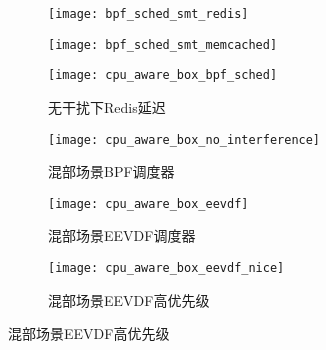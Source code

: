 \begin{figure}[H]
    \centering
    \begin{subfigure}[b]{0.49\textwidth}
        \texttt{[image: bpf\_sched\_smt\_redis]}
        \label{fig:bpf_sched_smt_redis}
    \end{subfigure}
    \begin{subfigure}[b]{0.49\textwidth}
        \texttt{[image: bpf\_sched\_smt\_memcached]}
        \label{fig:bpf_sched_smt_memcached}
    \end{subfigure}
\label{fig:lc_bpf_sched}
\end{figure}

\begin{figure}[H]
    \centering
    \begin{subfigure}[b]{0.4\textwidth}
        \texttt{[image: cpu\_aware\_box\_bpf\_sched]}
        \caption{无干扰下Redis延迟}
        \label{fig:cpu_aware_box_bpf_sched}
    \end{subfigure}
    \begin{subfigure}[b]{0.4\textwidth}
        \texttt{[image: cpu\_aware\_box\_no\_interference]}
        \caption{混部场景BPF调度器}
        \label{fig:cpu_aware_box_no_interference}
    \end{subfigure}
    \begin{subfigure}[b]{0.4\textwidth}
        \texttt{[image: cpu\_aware\_box\_eevdf]}
        \caption{混部场景EEVDF调度器}
        \label{fig:cpu_aware_box_eevdf}
    \end{subfigure}
    \begin{subfigure}[b]{0.4\textwidth}
        \texttt{[image: cpu\_aware\_box\_eevdf\_nice]}
        \caption{混部场景EEVDF高优先级}
        \label{fig:cpu_aware_box_eevdf_nice}
    \end{subfigure}
\label{fig:lc_box}
\end{figure}




